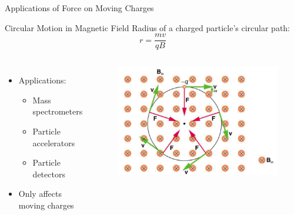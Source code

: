 \documentclass{beamer}
\begin{document}
\begin{frame}{Applications of Force on Moving Charges}
\begin{block}{Circular Motion in Magnetic Field}
Radius of a charged particle's circular path:
\begin{equation}
r = \frac{mv}{qB}
\end{equation}
\end{block}

\begin{columns}
\begin{itemize}
\item Applications:
\begin{itemize}
\item Mass spectrometers
\item Particle accelerators
\item Particle detectors
\end{itemize}
\item Only affects moving charges
\end{itemize}

\begin{figure}
\centering
\includegraphics[width=1\linewidth]{phys12-magnetism-magnetic-force-on-current-loop.png}
\end{figure}
\end{columns}
\end{frame}
\end{document}
